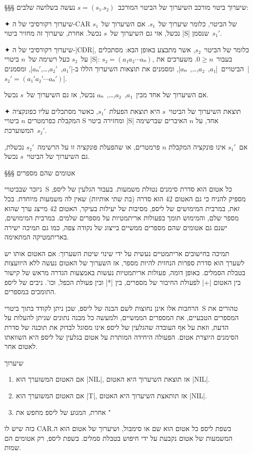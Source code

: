 §§§ שיערוך ביטוי מורכב 
השיערוך של הביטוי המורכב~$s=(s₁.s₂)$
נעשה בשלושה שלבים:
\begin{enumerate}
  ✦ שיערוך רקורסיבי של ה-CAR של הביטוי, כלומר שיערוך של~$s₁$. אם השיערוך
  של~$s₁$ נכשל, אזי גם השיערוך של~$s$ נכשל. אחרת, שיערוך זה מחזיר ביטוי \E|S|
  שנסמן~$s₁'$.

  ✦ שיערוך רקורסיבי של ה-\E|CּּּּDR|, כלומר של הביטוי~$s₂$, אשר מתבצע באופן הבא:
  מסתכלים על~$s₂$ כעל רשימה של~$n$ ביטויי \E|S|: $s₂=(a₁ a₂⋯aₙ)$, בעבור~$0≥n$.
  משערכים את הביטויים~\E|$a₁$,~$a₂$,…,~$aₙ$|, ומסמנים את תוצאות השיערוך הללו
  ב-\E|$a₁'$,~$a₂'$,…,$aₙ'$|, ומסמנים~\E|$s₂'=(a₁' a₂'⋯aₙ')$|.

  אם השיערוך של אחד מבין~$a₁$,~$a₂$,…,~$aₙ$ נכשל, אז גם השיערוך של~$s$ נכשל.

  ✦ תוצאת השיערוך של הביטוי~$s$ היא תוצאת הפעלת~$s₁'$, כאשר מסתכלים עליו
  כפונקציה המקבלת כפרמטרים $n$ ביטויי S ומחזירה ביטוי \E|S| אחד, על $n$ האיברים
  שברשימה המשוערכת~$s₂'$.

  אם~$s₁'$ אינו פונקציה המקבלת $n$  פרמטרים, או שהפעלת פונקציה זו על
  הרשימה~$s₂'$ נכשלת, גם השיערוך של הביטוי~$s$ נכשל.
\end{enumerate}

§§§ אטומים שהם מספרים

ניזכר שבביטויי~S כל אטום הוא סדרת סימנים נטולת משמעות. בעבור הגלעין של ליספ,
מספיק להניח כי גם האטום 42 הוא סדרה (בת שתי אותיות) שאין לה משמעות מיוחדת. בכל
זאת, במרבית המימושים של ליספ, מסיבות של יעילות בעיקר, האטום 42 מייצג ערך שהוא
מספר שלם, והמימוש תומך בפעולות אריתמטיות על מספרים שלמים. במרבית המימושים, ישנם
גם אטומים שהם מספרים ממשיים בייצוג של נקודה צפה, כמו גם תמיכה ישירה באריתמטיקה
המתאימה.
 

תמיכה בחישובים אריתמטיים נעשית על ידי שינוי שיטת השערוך: אם האטום אותו יש לשערך
הוא סדרת ספרות הנחזית להיות מספר, אז השערוך של האטום נעשה ללא היוועצות בטבלת
הסמלים. באופן דומה, פעולות אריתמטיות נעשות באמצעות הגדרה מראש של קישור בין
האטום \A|+| לפעולת החיבור של מספרים, בין \A|*| ובין פעולת הכפל, וכו'.
ניבים של ליספ התומכים במספרים. 

הרחבות אלו אינן נחוצות לשם הבנה של ליספ, שכן ניתן לקודד בתוך ביטויי~S טהורים את
המספרים הטבעיים, את המספרים הממשיים, ולמעשה כל מבנה נתונים שניתן להעלות על
הדעת, וזאת על אף העובדה שהגלעין של ליספ אינו מסוגל לבדוק את תוכנה של סדרת
הסימנים היוצרת אטום. הפעולה היחידה המותרת על אטום בגלעין של ליספ היא השוואתו
לאטום אחר.

שיערוך
\begin{enumerate}
    \item אם האטום המשוערך הוא \A|NIL|, אז תוצאת השיערוך היא האטום \A|NIL|.
    \item אם האטום המשוערך הוא \A|T|, אז תותאצת השיערוך היא האטום \A|NIL|.
    \item אחרת, המנוע של ליספ מחפש את "
\end{enumerate}
כזה שיש לו CּARבשפת ליספ כל אטום הוא שם או סימבול,
ושיערוך של אטום
הוא ה.
המשמעות של אטום נקבעת על ידי חיפוש בטבלת סמלים. בשפת ליספ, רק אטומים הם שמות.

